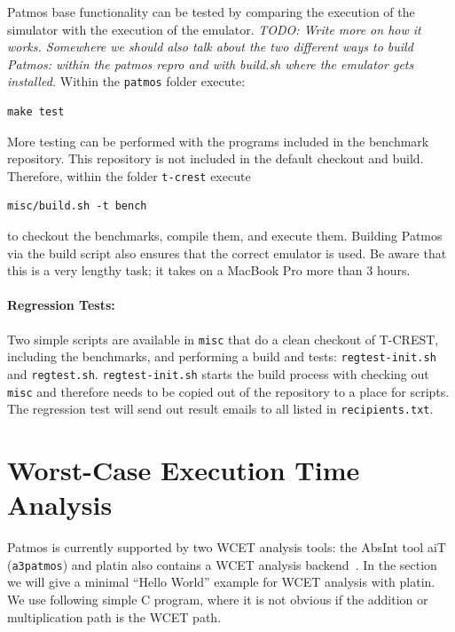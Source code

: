 \documentclass[a4paper,fontsize=10pt,twoside,DIV15,BCOR12mm,headinclude=true,footinclude=false,pagesize,bibtotoc]{scrbook}
\newcommand{\code}[1]{{\texttt{#1}}}
\newcommand{\todo}[1]{{\emph{TODO: #1}}}
\begin{document}
Patmos base functionality can be tested by comparing the execution of the simulator with
the execution of the emulator. \todo{Write more on how it works. Somewhere we should also
talk about the two different ways to build Patmos: within the patmos repro and with build.sh
where the emulator gets installed.}
Within the \code{patmos} folder execute:

\begin{verbatim}
make test
\end{verbatim}

More testing can be performed with the programs included in the benchmark repository.
This repository is not included in the default checkout and build. Therefore, within the
folder \code{t-crest} execute

\begin{verbatim}
misc/build.sh -t bench
\end{verbatim}

to checkout the benchmarks, compile them, and execute them. Building Patmos via the build script
also ensures that the correct emulator is used. Be aware that this is
a very lengthy task; it takes on a MacBook Pro more than 3 hours.

\paragraph{Regression Tests:} Two simple scripts are available in \code{misc} that do
a clean checkout of T-CREST, including the benchmarks, and performing a build
and tests: \code{regtest-init.sh} and \code{regtest.sh}. \code{regtest-init.sh} starts
the build process with checking out \code{misc} and therefore needs to
be copied out of the repository to a place for scripts. The regression test will
send out result emails to all listed in \code{recipients.txt}.

\section{Worst-Case Execution Time Analysis}

Patmos is currently supported by two WCET analysis tools:
the AbsInt tool aiT~\cite{aiT} (\code{a3patmos}) and platin also contains
a WCET analysis backend~\cite{compiler:platin:kps15}.
In the section we will give a minimal ``Hello World'' example for WCET analysis
with platin. We use following simple C program, where it is not obvious if the
addition or multiplication path is the WCET path.
\end{document}
